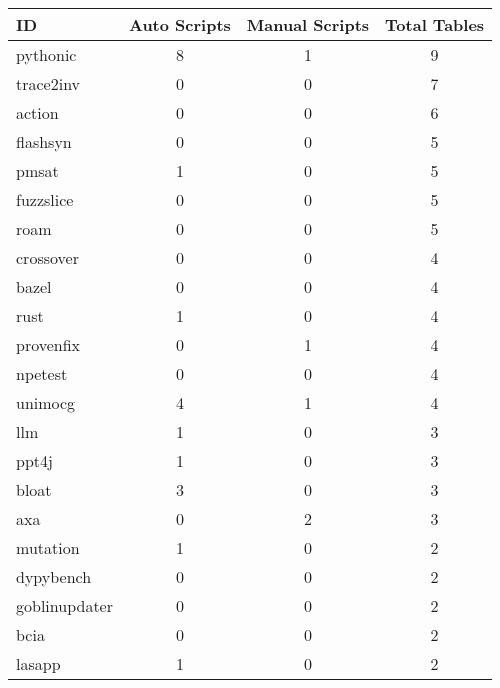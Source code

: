 \begin{tabular}{lccc}
\toprule
 ID            &  Auto Scripts  &  Manual Scripts  &  Total Tables  \\
\midrule
 pythonic      &       8        &        1         &       9        \\
 trace2inv     &       0        &        0         &       7        \\
 action        &       0        &        0         &       6        \\
 flashsyn      &       0        &        0         &       5        \\
 pmsat         &       1        &        0         &       5        \\
 fuzzslice     &       0        &        0         &       5        \\
 roam          &       0        &        0         &       5        \\
 crossover     &       0        &        0         &       4        \\
 bazel         &       0        &        0         &       4        \\
 rust          &       1        &        0         &       4        \\
 provenfix     &       0        &        1         &       4        \\
 npetest       &       0        &        0         &       4        \\
 unimocg       &       4        &        1         &       4        \\
 llm           &       1        &        0         &       3        \\
 ppt4j         &       1        &        0         &       3        \\
 bloat         &       3        &        0         &       3        \\
 axa           &       0        &        2         &       3        \\
 mutation      &       1        &        0         &       2        \\
 dypybench     &       0        &        0         &       2        \\
 goblinupdater &       0        &        0         &       2        \\
 bcia          &       0        &        0         &       2        \\
 lasapp        &       1        &        0         &       2        \\

\end{tabular}
